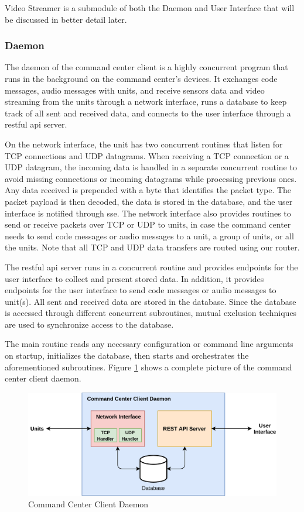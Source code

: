 Video Streamer is a submodule of both the Daemon and User Interface that will be discussed in better detail later.

\subsubsection{Daemon}
The daemon of the command center client is a highly concurrent program that runs in the background on the command center's devices. It exchanges code messages, audio messages with units, and receive sensors data and video streaming from the units through a network interface, runs a database to keep track of all sent and received data, and connects to the user interface through a \acrshort{rest}ful \acrshort{api} server.

On the network interface, the unit has two concurrent routines that listen for TCP connections and UDP datagrams. When receiving a TCP connection or a UDP datagram, the incoming data is handled in a separate concurrent routine to avoid missing connections or incoming datagrams while processing previous ones. Any data received is prepended with a byte that identifies the packet type. The packet payload is then decoded, the data is stored in the database, and the user interface is notified through \acrfull{sse}. The network interface also provides routines to send or receive packets over TCP or UDP to units, in case the command center needs to send code messages or audio messages to a unit, a group of units, or all the units. Note that all TCP and UDP data transfers are routed using our router.

The \acrshort{rest}ful \acrshort{api} server runs in a concurrent routine and provides endpoints for the user interface to collect and present stored data. In addition, it provides endpoints for the user interface to send code messages or audio messages to unit(s). All sent and received data are stored in the database. Since the database is accessed through different concurrent subroutines, mutual exclusion techniques are used to synchronize access to the database.

The main routine reads any necessary configuration or command line arguments on startup, initializes the database, then starts and orchestrates the aforementioned subroutines. Figure \ref{fig:cmd-daemon} shows a complete picture of the command center client daemon.

\begin{figure}[!htb]
    \centering
    \includegraphics[width=\linewidth]{images/cmd-daemon.png}
    \caption{Command Center Client Daemon}
    \label{fig:cmd-daemon}
\end{figure} 


